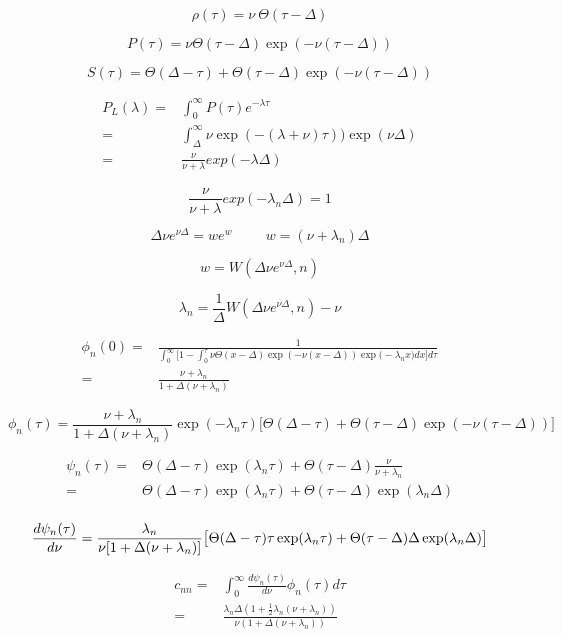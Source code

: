 \documentclass[a4paper,12pt,twoside]{article}
\def \be {\begin{equation}}
\def \ee {\end{equation}}
\begin{document}
\be
\rho(\tau)=\nu\:\Theta(\tau-\Delta)
\ee

\be
P(\tau)=\nu \Theta(\tau-\Delta) \exp(-\nu(\tau-\Delta))
\ee


\be
S(\tau)=\Theta(\Delta-\tau) +  \Theta(\tau-\Delta) \exp(-\nu(\tau-\Delta))
\ee

\begin{align}
P_L(\lambda)=&\int_0^\infty P(\tau)e^{-\lambda \tau}\\
=&\int_\Delta^\infty \nu \exp(-(\lambda+\nu)\tau))\exp(\nu \Delta)\\
=&\frac{\nu}{\nu+\lambda}exp(-\lambda \Delta)
\end{align}

\be
\frac{\nu}{\nu+\lambda}exp(-\lambda_n \Delta)=1
\ee

\be
\Delta \nu e^{\nu\Delta}=we^{w} \hspace{1cm} w=(\nu+\lambda_n)\Delta
\ee

\be
w=W(\Delta \nu e^{\nu\Delta},n)
\ee

\be
\lambda_n=\frac{1}{\Delta}W(\Delta \nu e^{\nu\Delta},n) - \nu
\ee

\begin{align}
\phi_n(0) =&\frac{1}{\int_0^{\infty}\big[1-\int^\tau_0 \nu \Theta(x-\Delta) \exp(-\nu(x-\Delta)) \exp\big(-\lambda_nx)dx\big]d\tau}\\
=& \frac{\nu+\lambda_n}{1+\Delta(\nu+\lambda_n)}
\end{align}

\be
\phi_n(\tau)= \frac{\nu+\lambda_n}{1+\Delta(\nu+\lambda_n)}\exp(-\lambda_n\tau)\big[\Theta(\Delta-\tau) +  \Theta(\tau-\Delta) \exp(-\nu(\tau-\Delta))\big]
\ee


\begin{align}
\psi_n(\tau)=&\Theta(\Delta-\tau)\exp(\lambda_n\tau) +  \Theta(\tau-\Delta) \frac{\nu}{\nu+\lambda_n}\\
=&\Theta(\Delta-\tau)\exp(\lambda_n\tau) +  \Theta(\tau-\Delta) \exp(\lambda_n\Delta)\\
\end{align}


\be
\frac{d\psi_n(\tau)}{d\nu}=\frac{\lambda_n}{\nu[1+\Delta(\nu+\lambda_n)]}\big[\Theta(\Delta-\tau)\tau\exp(\lambda_n\tau) +  \Theta(\tau-\Delta)\Delta \exp(\lambda_n\Delta)\big]\\
\ee


\begin{align}
c_{nn}=&\int_0^\infty\frac{d\psi_n(\tau)}{d\nu}\phi_n(\tau)d\tau\\
=&\frac{\lambda_n\Delta(1+\frac{1}{2}\lambda_n(\nu+\lambda_n))}{\nu(1+\Delta(\nu+\lambda_n))}
\end{align}
\end{document}
